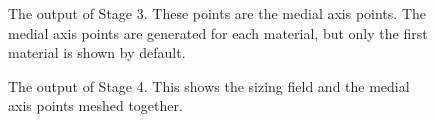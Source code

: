 \documentclass[fleqn,12pt,openany]{book}
\begin{document}
\begin{figure}
\begin{center}
\end{center}
\caption{\label{fig:tooth_stage2-2} The output of Stage 3.  These points are the medial axis points.  The medial axis points are generated for each material, but only the first material is shown by default.}
\end{figure} 


\begin{figure}
\begin{center}
\end{center}
\caption{\label{fig:tooth_stage3} The output of Stage 4.  This shows the sizing field and the medial axis points meshed together.}
\end{figure} 
\end{document}
